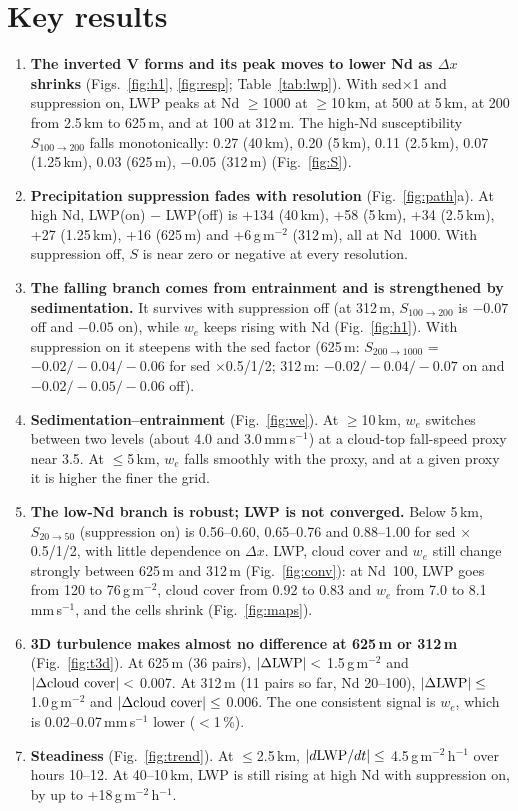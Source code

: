 \documentclass[10pt]{article}
\begin{document}
\section*{Key results}
\begin{enumerate}
\item \textbf{The inverted V forms and its peak moves to lower Nd as $\Delta x$ shrinks} (Figs.~\ref{fig:h1}, \ref{fig:resp}; Table~\ref{tab:lwp}).
With sed$\times$1 and suppression on, LWP peaks at Nd $\geq$1000 at $\geq$10\,km, at 500 at 5\,km, at 200 from 2.5\,km to 625\,m, and at 100 at 312\,m.
The high-Nd susceptibility $S_{100\to200}$ falls monotonically: 0.27 (40\,km), 0.20 (5\,km), 0.11 (2.5\,km), 0.07 (1.25\,km), 0.03 (625\,m), $-0.05$ (312\,m) (Fig.~\ref{fig:S}).
\item \textbf{Precipitation suppression fades with resolution} (Fig.~\ref{fig:path}a). At high Nd, LWP(on) $-$ LWP(off) is +134 (40\,km), +58 (5\,km),
+34 (2.5\,km), +27 (1.25\,km), +16 (625\,m) and +6\,g\,m$^{-2}$ (312\,m), all at Nd~1000. With suppression off, $S$ is near zero or negative at every resolution.
\item \textbf{The falling branch comes from entrainment and is strengthened by sedimentation.} It survives with suppression off
(at 312\,m, $S_{100\to200}$ is $-0.07$ off and $-0.05$ on), while $w_e$ keeps rising with Nd (Fig.~\ref{fig:h1}). With suppression on it steepens with the sed factor
(625\,m: $S_{200\to1000}$ = $-0.02/-0.04/-0.06$ for sed $\times$0.5/1/2; 312\,m: $-0.02/-0.04/-0.07$ on and $-0.02/-0.05/-0.06$ off).
\item \textbf{Sedimentation--entrainment} (Fig.~\ref{fig:we}). At $\geq$10\,km, $w_e$ switches between two levels (about 4.0 and 3.0\,mm\,s$^{-1}$) at a cloud-top
fall-speed proxy near 3.5. At $\leq$5\,km, $w_e$ falls smoothly with the proxy, and at a given proxy it is higher the finer the grid.
\item \textbf{The low-Nd branch is robust; LWP is not converged.} Below 5\,km, $S_{20\to50}$ (suppression on) is 0.56--0.60, 0.65--0.76 and 0.88--1.00 for sed
$\times$0.5/1/2, with little dependence on $\Delta x$. LWP, cloud cover and $w_e$ still change strongly between 625\,m and 312\,m (Fig.~\ref{fig:conv}):
at Nd~100, LWP goes from 120 to 76\,g\,m$^{-2}$, cloud cover from 0.92 to 0.83 and $w_e$ from 7.0 to 8.1\,mm\,s$^{-1}$, and the cells shrink (Fig.~\ref{fig:maps}).
\item \textbf{3D turbulence makes almost no difference at 625\,m or 312\,m} (Fig.~\ref{fig:t3d}). At 625\,m (36 pairs), $|\Delta{\rm LWP}| <$ 1.5\,g\,m$^{-2}$ and $|\Delta{\rm cloud\ cover}| <$ 0.007.
At 312\,m (11 pairs so far, Nd 20--100), $|\Delta{\rm LWP}| \leq$ 1.0\,g\,m$^{-2}$ and $|\Delta{\rm cloud\ cover}| \leq$ 0.006.
The one consistent signal is $w_e$, which is 0.02--0.07\,mm\,s$^{-1}$ lower ($<$1\,\%).
\item \textbf{Steadiness} (Fig.~\ref{fig:trend}). At $\leq$2.5\,km, $|d{\rm LWP}/dt| \leq$ 4.5\,g\,m$^{-2}$\,h$^{-1}$ over hours 10--12.
At 40--10\,km, LWP is still rising at high Nd with suppression on, by up to +18\,g\,m$^{-2}$\,h$^{-1}$.
\end{enumerate}
\end{document}
